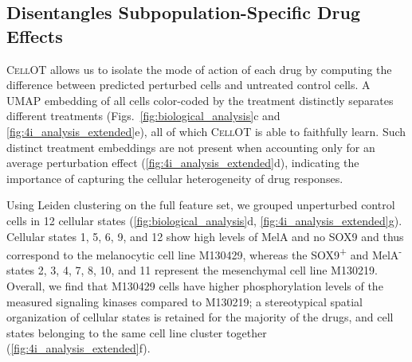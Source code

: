 \subsection{Disentangles Subpopulation-Specific Drug Effects}
\textsc{CellOT} allows us to 
isolate the mode of action of each drug by computing the difference between predicted perturbed cells and untreated control cells. %
A \acrshort{UMAP} embedding of all cells color-coded by the treatment distinctly separates different treatments (Figs.~\ref{fig:biological_analysis}c and \ref{fig:4i_analysis_extended}e), all of which \textsc{CellOT} is able to faithfully learn.
Such distinct treatment embeddings are not present when accounting only for an average perturbation effect (\cref{fig:4i_analysis_extended}d), indicating the importance of capturing the cellular heterogeneity of drug responses.

 Using Leiden clustering on the full feature set, we grouped unperturbed control cells in 12 cellular states (\cref{fig:biological_analysis}d, \cref{fig:4i_analysis_extended}g). Cellular states 1, 5, 6, 9, and 12 show high levels of MelA and no SOX9 and thus correspond to the melanocytic cell line M130429, whereas the SOX9\textsuperscript{+} and MelA\textsuperscript{-} states 2, 3, 4, 7, 8, 10, and 11 represent the mesenchymal cell line M130219. Overall, we find that M130429 cells have higher phosphorylation levels of the measured signaling kinases compared to M130219;
a stereotypical spatial organization of cellular states is retained for the majority of the drugs,  and cell states belonging to the same cell line cluster together (\cref{fig:4i_analysis_extended}f). 

